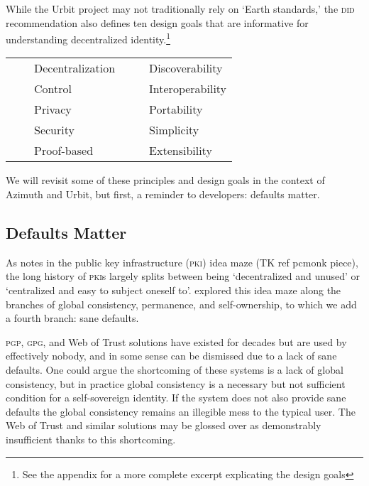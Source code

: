 \documentclass[twoside]{article}
\newcommand{\tabitem}{~~\llap{\textbullet}~~}
\begin{document}
While the Urbit project may not traditionally rely on `Earth standards,' the \textsc{did} recommendation also defines ten design goals that are informative for understanding decentralized identity.\footnote{See the appendix for a more complete excerpt explicating the design goals}

\begin{tabular}{ll}
  \tabitem  Decentralization
  &
  \tabitem  Discoverability \\
  \tabitem  Control
  &
  \tabitem  Interoperability \\
  \tabitem  Privacy
  &
  \tabitem  Portability \\
  \tabitem  Security
  &
  \tabitem  Simplicity \\
  \tabitem  Proof-based
  &
  \tabitem  Extensibility \\
\end{tabular}

We will revisit some of these principles and design goals in the context of Azimuth and Urbit, but first, a reminder to developers: defaults matter.

\subsection{Defaults Matter}

As  notes in the public key infrastructure (\textsc{pki}) idea maze (TK ref pcmonk piece), the long history of \textsc{pki}s largely splits between being `decentralized and unused' or `centralized and easy to subject oneself to'.   explored this idea maze along the branches of global consistency, permanence, and self-ownership, to which we add a fourth branch: sane defaults.

\textsc{pgp}, \textsc{gpg}, and Web of Trust solutions have existed for decades but are used by effectively nobody, and in some sense can be dismissed due to a lack of sane defaults. One could argue the shortcoming of these systems is a lack of global consistency, but in practice global consistency is a necessary but not sufficient condition for a self-sovereign identity. If the system does not also provide sane defaults the global consistency remains an illegible mess to the typical user. The Web of Trust and similar solutions may be glossed over as demonstrably insufficient thanks to this shortcoming.
\end{document}

